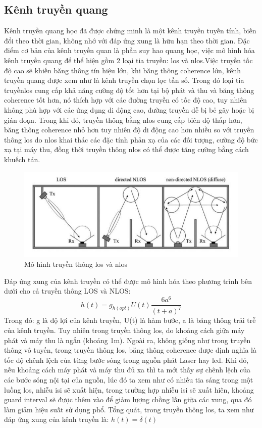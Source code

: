 \subsection{Kênh truyền quang}
Kênh truyền quang học đã được chứng minh là một kênh truyền tuyến tính, biến đổi theo thời gian, không nhớ với đáp ứng xung là hữu hạn theo thời gian. Đặc điểm cơ bản của kênh truyền quan là phần suy hao quang học, việc mô hình hóa kênh truyền quang để thể hiện gồm 2 loại tia truyền: \ac{los} và \ac{nlos}.Việc truyền tốc độ cao sẽ khiến băng thông tín hiệu lớn, khi băng thông coherence lớn, kênh truyền quang được xem như là kênh truyền chọn lọc tần số. Trong đó loại tia truyền\ac{los} cung cấp khả năng cường độ tốt hơn tại bộ phát và thu và băng thông coherence tốt hơn, nó thích hợp với các đường truyền có tốc độ cao, tuy nhiên không phù hợp với các ứng dụng di động cao, đường truyền dễ bị bẻ gãy hoặc bị gián đoạn. Trong khi đó, truyền thông bằng \ac{nlos} cung cấp biên độ thấp hơn, băng thông coherence nhỏ hơn tuy nhiên độ di động cao hơn nhiều so với truyền thông \ac{los} do \ac{nlos} khai thác các đặc tính phản xạ của các đối tượng, cường độ bức xạ tại máy thu, đồng thời truyền thông \ac{nlos} có thể được tăng cường bằng cách khuếch tán. 
\begin{figure} [ht]
	\centering
	\captionsetup{justification=centering}
	\includegraphics [scale=1] {Image/LOS_NLOS}
	\caption{Mô hình truyền thông \ac{los} và \ac{nlos}}
\end{figure}

Đáp ứng xung của kênh truyền có thể được mô hình hóa theo phương trình bên dưới cho cả truyền thông
LOS và NLOS:
\begin{equation}
h(t) = g_{h(opt)}U(t) \frac{6a^6}{(t+a)^7}
\end{equation}
Trong đó: g là độ lợi của kênh truyền, U(t) là hàm bước, a là băng thông trải trễ của kênh
truyền. Tuy nhiên trong truyền thông \ac{los}, do khoảng cách giữa máy phát và máy thu là ngắn (khoảng 1m). Ngoài ra, không giống như trong truyền thông vô tuyến, trong truyền thông \ac{los}, băng thông coherence được định nghĩa là tốc độ chênh lệch của từng bước sóng trong nguồn phát Laser hay \ac{led}. Khi đó, nếu khoảng cách máy phát và máy thu đủ xa thì ta mới thấy sự chênh lệch của các bước sóng nội tại của nguồn, lúc đó ta xem như có nhiều tia sáng trong một luồng \ac{los}, nhiễu \ac{isi} sẽ xuất hiện, trong trường hợp nhiễu \ac{isi} sẽ xuất hiên, khoảng guard interval sẽ được thêm vào để giảm lượng chồng lấn giữa các xung, qua đó làm giảm hiệu suất sử dụng phổ. Tổng quát, trong truyền thông \ac{los}, ta xem như đáp ứng xung của kênh truyền là: $h(t) = \delta (t)$


